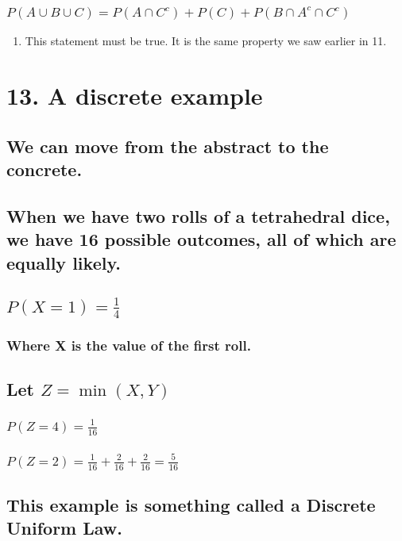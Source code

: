 \documentclass[11pt]{article}
\begin{document}
\subsubsection{\(P( A \cup B \cup C ) = P( A \cap C^c ) + P(C) + P( B \cap A^c \cap C^c )\)}
\label{sec:orga5c97d1}
\begin{enumerate}
\item This statement must be true. It is the same property we saw earlier in 11.
\label{sec:org274d8a6}
\end{enumerate}
\section{13. A discrete example}
\label{sec:orgd88b521}
\subsection{We can move from the abstract to the concrete.}
\label{sec:org33ce633}
\subsection{When we have two rolls of a tetrahedral dice, we have 16 possible outcomes, all of which are equally likely.}
\label{sec:org3017d18}
\subsection{\(P(X=1) = \frac{1}{4}\)}
\label{sec:orgc51971e}
\subsubsection{Where X is the value of the first roll.}
\label{sec:orgcefcda6}
\subsection{Let \(Z=\min(X,Y)\)}
\label{sec:orgbbd2a53}
\subsubsection{\(P(Z=4)= \frac{1}{16}\)}
\label{sec:org02516aa}
\subsubsection{\(P(Z=2) = \frac{1}{16} + \frac{2}{16} + \frac{2}{16} = \frac{5}{16}\)}
\label{sec:org148fd9a}
\subsection{This example is something called a Discrete Uniform Law.}
\label{sec:org4a104e5}
\end{document}
